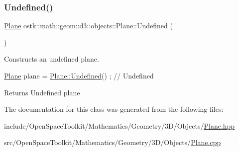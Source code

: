 \subsubsection{\texorpdfstring{Undefined()}{Undefined()}}
{\footnotesize\ttfamily \hyperlink{classostk_1_1math_1_1geom_1_1d3_1_1objects_1_1_plane}{Plane} ostk\+::math\+::geom\+::d3\+::objects\+::\+Plane\+::\+Undefined (\begin{DoxyParamCaption}{ }\end{DoxyParamCaption})\hspace{0.3cm}{\ttfamily [static]}}



Constructs an undefined plane. 


\begin{DoxyCode}
\hyperlink{classostk_1_1math_1_1geom_1_1d3_1_1objects_1_1_plane_ac66c2a3b3d9d7cd1fd507123091bb38f}{Plane} plane = \hyperlink{classostk_1_1math_1_1geom_1_1d3_1_1objects_1_1_plane_a162297dffbd860cd6c383e412708734f}{Plane::Undefined}() ; \textcolor{comment}{// Undefined}
\end{DoxyCode}


\begin{DoxyReturn}{Returns}
Undefined plane 
\end{DoxyReturn}


The documentation for this class was generated from the following files\+:\begin{DoxyCompactItemize}
\item 
include/\+Open\+Space\+Toolkit/\+Mathematics/\+Geometry/3\+D/\+Objects/\hyperlink{_plane_8hpp}{Plane.\+hpp}\item 
src/\+Open\+Space\+Toolkit/\+Mathematics/\+Geometry/3\+D/\+Objects/\hyperlink{_plane_8cpp}{Plane.\+cpp}\end{DoxyCompactItemize}
